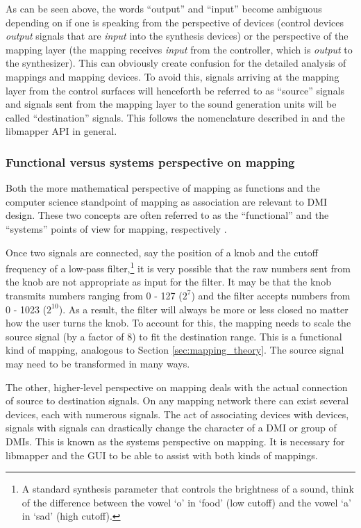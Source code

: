As can be seen above, the words ``output'' and ``input'' become ambiguous depending on if one is speaking from the perspective of devices (control devices \emph{output} signals that are \emph{input} into the synthesis devices) or the perspective of the mapping layer (the mapping receives \emph{input} from the controller, which is \emph{output} to the synthesizer). This can obviously create confusion for the detailed analysis of mappings and mapping devices. To avoid this, signals arriving at the mapping layer from the control surfaces will henceforth be referred to as ``source'' signals and signals sent from the mapping layer to the sound generation units will be called ``destination'' signals. This follows the nomenclature described in  and the libmapper API in general.

	\subsubsection{Functional versus systems perspective on mapping}

Both the more mathematical perspective of mapping as functions and the computer science standpoint of mapping as association are relevant to DMI design. These two concepts are often referred to as the ``functional'' and the ``systems'' points of view for mapping, respectively \cite{two_types_of_mapping}. 

Once two signals are connected, say the position of a knob and the cutoff frequency of a low-pass filter,\footnote{A standard synthesis parameter that controls the brightness of a sound, think of the difference between the vowel `o' in `food' (low cutoff) and the vowel `a' in `sad' (high cutoff).} it is very possible that the raw numbers sent from the knob are not appropriate as input for the filter. It may be that the knob transmits numbers ranging from 0 - 127 ($2^7$) and the filter accepts numbers from 0 - 1023 ($2^{10}$). As a result, the filter will always be more or less closed no matter how the user turns the knob. To account for this, the mapping needs to scale the source signal (by a factor of 8) to fit the destination range. This is a functional kind of mapping, analogous to Section \ref{sec:mapping_theory}. The source signal may need to be transformed in many ways. 

The other, higher-level perspective on mapping deals with the actual connection of source to destination signals. On any mapping network there can exist several devices, each with numerous signals. The act of associating devices with devices, signals with signals can drastically change the character of a DMI or group of DMIs. This is known as the systems perspective on mapping. It is necessary for libmapper and the GUI to be able to assist with both kinds of mappings.

